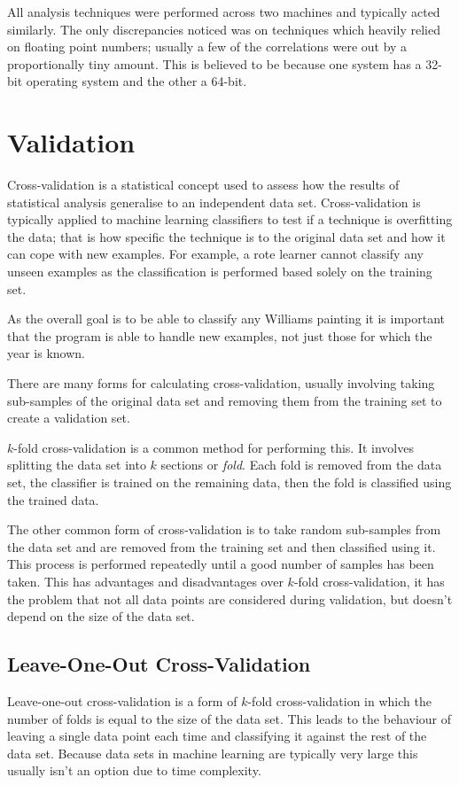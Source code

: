 All analysis techniques were performed across two machines and typically acted similarly. The only
discrepancies noticed was on techniques which heavily relied on floating point numbers; usually a
few of the correlations were out by a proportionally tiny amount. This is believed to be because 
one system has a 32-bit operating system and the other a 64-bit.


\section{Validation}
Cross-validation is a statistical concept used to assess how the results of statistical analysis
generalise to an independent data set. Cross-validation is typically applied to machine learning
classifiers to test if a technique is overfitting the data; that is how specific the technique is
to the original data set and how it can cope with new examples. For example, a rote learner cannot
classify any unseen examples as the classification is performed based solely on the training set.

As the overall goal is to be able to classify any Williams painting it is important that the 
program is able to handle new examples, not just those for which the year is known.

There are many forms for calculating cross-validation, usually involving taking sub-samples of the
original data set and removing them from the training set to create a validation set.

$k$-fold cross-validation is a common method for performing this. It involves splitting the data
set into $k$ sections or \emph{fold}. Each fold is removed from the data set, the classifier is
trained on the remaining data, then the fold is classified using the trained data. 

The other common form of cross-validation is to take random sub-samples from the data set and are
removed from the training set and then classified using it. This process is performed repeatedly
until a good number of samples has been taken. This has advantages and disadvantages over $k$-fold
cross-validation, it has the problem that not all data points are considered during validation,
but doesn't depend on the size of the data set.


\subsection{Leave-One-Out Cross-Validation}
Leave-one-out cross-validation is a form of $k$-fold cross-validation in which the number of folds
is equal to the size of the data set. This leads to the behaviour of leaving a single data point
each time and classifying it against the rest of the data set. Because data sets in machine 
learning are typically very large this usually isn't an option due to time complexity.

